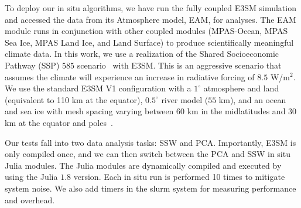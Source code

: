 \documentclass{juliacon}
\begin{document}
To deploy our in situ algorithms, we have run the fully coupled E3SM simulation and accessed the data from its Atmosphere model, EAM, for analyses. The EAM module runs in conjunction with other coupled modules (MPAS-Ocean, MPAS Sea Ice, MPAS Land Ice, and Land Surface) to produce scientifically meaningful climate data. In this work, we use a realization of the Shared Socioeconomic Pathway (SSP) $585$ scenario~\cite{Eyring} with E3SM. This is an aggressive scenario that assumes the climate will experience an increase in radiative forcing of $8.5$ W/m$^2$. We use the standard E3SM V1 configuration with a $1^{\circ}$ atmosphere and land (equivalent to 110 km at the equator), $0.5^{\circ}$ river model ($55$ km), and an ocean and sea ice with mesh spacing varying between $60$ km in the midlatitudes and $30$ km at the equator and poles~\cite{e3sm_v1}. %


Our tests fall into two data analysis tasks: SSW and PCA. Importantly, E3SM is only compiled once, and we can then switch between the PCA and SSW in situ Julia modules. The Julia modules are dynamically compiled and executed by using the Julia $1.8$ version. Each in situ run is performed 10 times to mitigate system noise. We also add timers in the slurm system for measuring performance and overhead.
\end{document}

